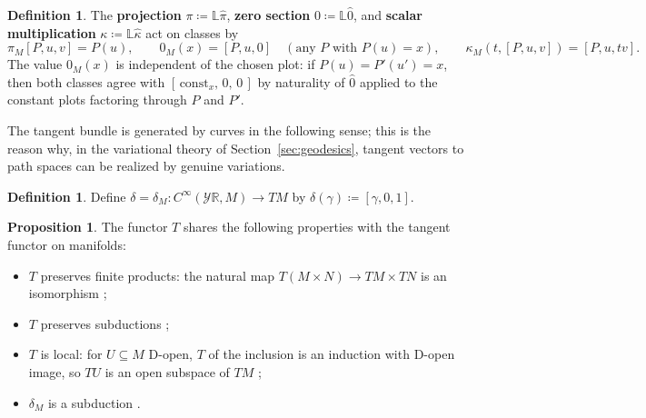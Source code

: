 \documentclass{amsart}
\newcommand{\R}{\mathbb{R}}
\theoremstyle{definition}
\newtheorem{defn}[thm]{Definition}
\newtheorem{prop}[thm]{Proposition}
\begin{document}
\begin{defn}\label{def:nat-trans}
The \textbf{projection} $\pi \coloneqq \mathbb{L}\hat{\pi}$,
\textbf{zero section} $0 \coloneqq \mathbb{L}\hat{0}$, and
\textbf{scalar multiplication} $\kappa \coloneqq \mathbb{L}\hat{\kappa}$ act
on classes by
\begin{equation*}
  \pi_M[P,u,v] = P(u), \qquad
  0_M(x) = [P,u,0] \quad (\text{any } P \text{ with } P(u)=x), \qquad
  \kappa_M(t,[P,u,v]) = [P,u,tv].
\end{equation*}
The value $0_M(x)$ is independent of the chosen plot: if $P(u) = P'(u') = x$,
then both classes agree with $[\,\mathrm{const}_x,\,0,\,0\,]$ by naturality of
$\hat{0}$ applied to the constant plots factoring through $P$ and $P'$.
\end{defn}

The tangent bundle is generated by curves in the following sense; this is the
reason why, in the variational theory of Section~\ref{sec:geodesics}, tangent
vectors to path spaces can be realized by genuine variations.

\begin{defn}\label{def:delta}
  Define $\delta = \delta_M \colon C^{\infty}(\mathcal{Y}\R, M) \to TM$ by
  $\delta(\gamma) \coloneqq [\gamma, 0, 1]$.
\end{defn}

\begin{prop}\label{prop:tangent-structure-1}
  The functor $T$ shares the following properties with the tangent functor on
  manifolds:
  \begin{itemize}
    \item $T$ preserves finite products: the natural map
      $T(M \times N) \to TM \times TN$ is an isomorphism
      {\cite[Corollary~2.2.19]{B24}};
    \item $T$ preserves subductions {\cite[Proposition~2.2.16]{B24}};
    \item $T$ is local: for $U \subseteq M$ D-open, $T$ of the inclusion is an
      induction with D-open image, so $TU$ is an open subspace of $TM$
      {\cite[Proposition~3.35]{B23}};
    \item $\delta_M$ is a subduction {\cite[Proposition~2.2.20]{B24}}.
  \end{itemize}
\end{prop}
\end{document}
